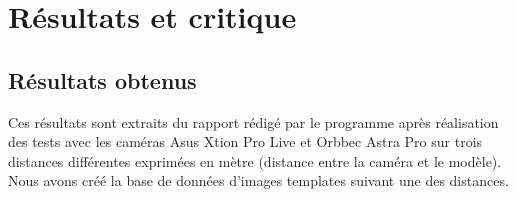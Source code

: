 \documentclass[a4paper, 12pt]{book}
\newcounter{program}[subsection]
\begin{document}
\section{Résultats et critique}
\subsection{Résultats obtenus}
Ces résultats sont extraits du rapport rédigé par le programme après réalisation des tests avec les caméras Asus Xtion Pro Live et Orbbec Astra Pro sur trois distances différentes exprimées en mètre (distance entre la caméra et le modèle). Nous avons créé la base de données d'images templates suivant une des distances.  \\ \\

\vspace{2cm}
\end{document}

